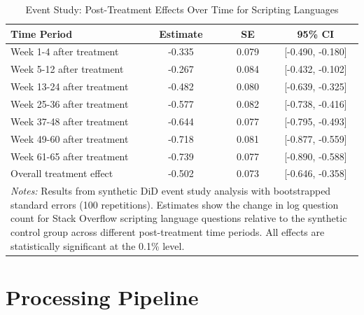 \begin{table}[H]
    \centering
    \caption{Event Study: Post-Treatment Effects Over Time for Scripting Languages}
    \label{tab:app-event_study_results}
    \begin{tabular}{lccc}
    \toprule
    Time Period & Estimate & SE & 95\% CI \\
    \midrule
    Week 1-4 after treatment   & -0.335 & 0.079 & [-0.490, -0.180] \\
    Week 5-12 after treatment  & -0.267 & 0.084 & [-0.432, -0.102] \\
    Week 13-24 after treatment & -0.482 & 0.080 & [-0.639, -0.325] \\
    Week 25-36 after treatment & -0.577 & 0.082 & [-0.738, -0.416] \\
    Week 37-48 after treatment & -0.644 & 0.077 & [-0.795, -0.493] \\
    Week 49-60 after treatment & -0.718 & 0.081 & [-0.877, -0.559] \\
    Week 61-65 after treatment & -0.739 & 0.077 & [-0.890, -0.588] \\
    \midrule
    Overall treatment effect & -0.502 & 0.073 & [-0.646, -0.358] \\
    \bottomrule
    \multicolumn{4}{p{0.95\linewidth}}{\footnotesize \textit{Notes:} Results from synthetic DiD event study analysis with bootstrapped standard errors (100 repetitions). Estimates show the change in log question count for Stack Overflow scripting language questions relative to the synthetic control group across different post-treatment time periods. All effects are statistically significant at the 0.1\% level.} \\
    \end{tabular}
\end{table}


\section{Processing Pipeline}\label{app:procpipe}

